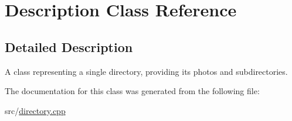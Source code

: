 \hypertarget{classDescription}{\section{Description Class Reference}
\label{classDescription}
}


\subsection{Detailed Description}
A class representing a single directory, providing its photos and subdirectories. 

The documentation for this class was generated from the following file\-:\begin{DoxyCompactItemize}
\item 
src/\hyperlink{directory_8cpp}{directory.\-cpp}\end{DoxyCompactItemize}

